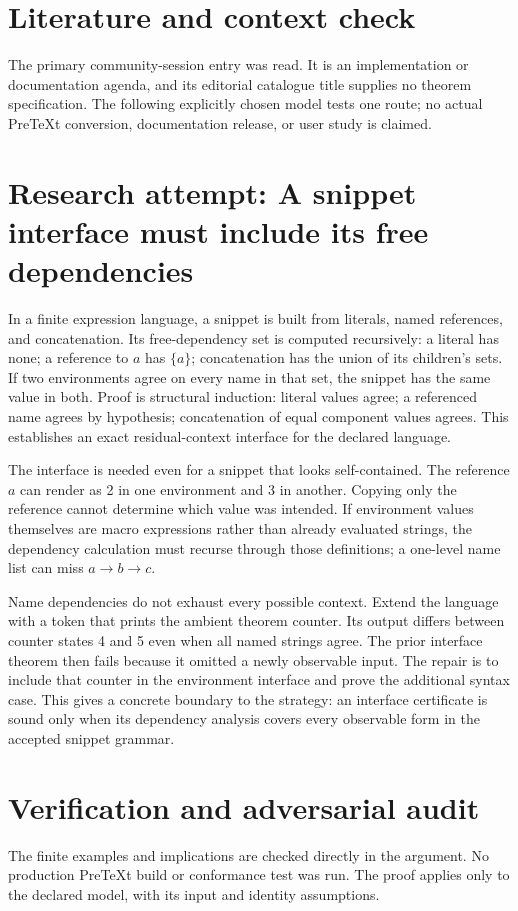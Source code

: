 \documentclass[11pt]{article}
\begin{document}
\section{Literature and context check}
The primary community-session entry was read. It is an implementation or documentation agenda, and its editorial catalogue title supplies no theorem specification. The following explicitly chosen model tests one route; no actual PreTeXt conversion, documentation release, or user study is claimed.
\section{Research attempt: A snippet interface must include its free dependencies}
In a finite expression language, a snippet is built from literals, named references, and concatenation. Its free-dependency set is computed recursively: a literal has none; a reference to $a$ has $\{a\}$; concatenation has the union of its children's sets. If two environments agree on every name in that set, the snippet has the same value in both. Proof is structural induction: literal values agree; a referenced name agrees by hypothesis; concatenation of equal component values agrees. This establishes an exact residual-context interface for the declared language.

The interface is needed even for a snippet that looks self-contained. The reference $a$ can render as 2 in one environment and 3 in another. Copying only the reference cannot determine which value was intended. If environment values themselves are macro expressions rather than already evaluated strings, the dependency calculation must recurse through those definitions; a one-level name list can miss $a\to b\to c$.

Name dependencies do not exhaust every possible context. Extend the language with a token that prints the ambient theorem counter. Its output differs between counter states 4 and 5 even when all named strings agree. The prior interface theorem then fails because it omitted a newly observable input. The repair is to include that counter in the environment interface and prove the additional syntax case. This gives a concrete boundary to the strategy: an interface certificate is sound only when its dependency analysis covers every observable form in the accepted snippet grammar.
\section{Verification and adversarial audit}
The finite examples and implications are checked directly in the argument. No production PreTeXt build or conformance test was run. The proof applies only to the declared model, with its input and identity assumptions.
\end{document}
